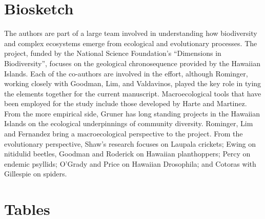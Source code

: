 \documentclass[12pt]{article}
\begin{document}
\begin{linenumbers}



\clearpage

\section*{Biosketch}

The authors are part of a large team involved in understanding how
biodiversity and complex ecosystems emerge from ecological and
evolutionary processes. The project, funded by the National Science
Foundation's ``Dimensions in Biodiversity'', focuses on the geological
chronosequence provided by the Hawaiian Islands. Each of the
co-authors are involved in the effort, although Rominger, working
closely with Goodman, Lim, and Valdavinos, played the key role in
tying the elements together for the current
manuscript. Macroecological tools that have been employed for the
study include those developed by Harte and Martinez. From the more
empirical side, Gruner has long standing projects in the Hawaiian
Islands on the ecological underpinnings of community
diversity. Rominger, Lim and Fernandez bring a macroecological
perspective to the project. From the evolutionary perspective, Shaw's
research focuses on Laupala crickets; Ewing on nitidulid beetles,
Goodman and Roderick on Hawaiian planthoppers; Percy on endemic
psyllids; O'Grady and Price on Hawaiian Drosophila; and Cotoras with
Gillespie on spiders.

\section*{Tables}


\end{linenumbers}
\end{document}
